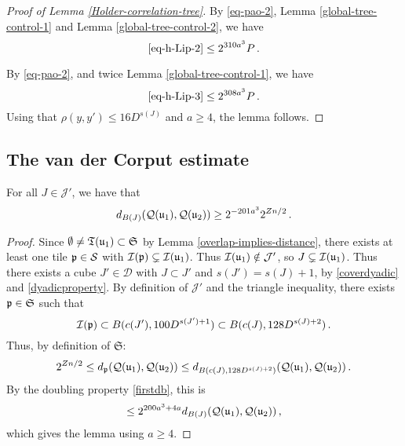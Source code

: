 {\begin{proof}[Proof of Lemma \ref{Holder-correlation-tree}]
        By \eqref{eq-pao-2}, Lemma \ref{global-tree-control-1} and Lemma \ref{global-tree-control-2}, we have
        $$
            \eqref{eq-h-Lip-2} \le  2^{310a^3} P\,.
        $$

        By \eqref{eq-pao-2}, and twice Lemma \ref{global-tree-control-1}, we have
        $$
            \eqref{eq-h-Lip-3} \le 2^{308a^3} P\,.
        $$
        Using that $\rho(y,y') \le 16D^{s(J)}$ and $a \ge 4$, the lemma follows.
    \end{proof}

\subsection{The van der Corput estimate}
\label{subsubsec-van-der-corput}
    \begin{lemma}
        \label{lower-oscillation-bound}
        For all $J \in \mathcal{J}'$, we have that
        $$
            d_{B(J)}({\mathcal{Q}}({\mathfrak u}_1), {\mathcal{Q}}({\mathfrak u}_2)) \ge 2^{-201a^3} 2^{Zn/2}\,.
        $$
    \end{lemma}

    \begin{proof}
    Since $\emptyset \ne {\mathfrak T}({\mathfrak u}_1) \subset \mathfrak{S}$ by Lemma \ref{overlap-implies-distance}, there exists at least one tile ${\mathfrak p} \in \mathcal{S}$ with ${\mathcal{I}}({\mathfrak p}) \subsetneq {\mathcal{I}}({\mathfrak u}_1)$. Thus ${\mathcal{I}}({\mathfrak u}_1) \notin \mathcal{J}'$, so $J \subsetneq {\mathcal{I}}({\mathfrak u}_1)$. Thus there exists a cube $J' \in \mathcal{D}$ with $J \subset J'$ and $s(J') = s(J) + 1$, by \eqref{coverdyadic} and \eqref{dyadicproperty}. By definition of $\mathcal{J'}$ and the triangle inequality, there exists ${\mathfrak p} \in \mathfrak{S}$ such that
    $$
        {\mathcal{I}}({\mathfrak p}) \subset B(c(J'), 100 D^{s(J') + 1}) \subset B(c(J), 128 D^{s(J)+2})\,.
    $$
    Thus, by definition of $\mathfrak{S}$:
    \begin{align*}
        2^{Zn/2} \le d_{{\mathfrak p}}({\mathcal{Q}}({\mathfrak u}_1), {\mathcal{Q}}({\mathfrak u}_2)) \le d_{B(c(J), 128 D^{s(J)+2})}({\mathcal{Q}}({\mathfrak u}_1), {\mathcal{Q}}({\mathfrak u}_2))\,.
    \end{align*}
    By the doubling property \eqref{firstdb}, this is
    $$
        \le 2^{200a^3 + 4a} d_{B(J)}({\mathcal{Q}}({\mathfrak u}_1), {\mathcal{Q}}({\mathfrak u}_2))\,,
    $$
    which gives the lemma using $a \ge 4$.
    \end{proof}

}
